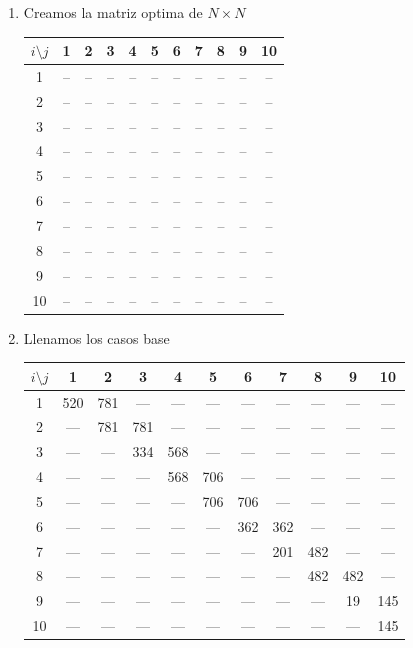 \begin{enumerate}
    \item Creamos la matriz optima de $N \times N$ 
    \begin{table}[h!]
    \centering
    \begin{tabular}{ccccccccccc}
    \toprule
    $i \setminus j$ & 1 & 2 & 3 & 4 & 5 & 6 & 7 & 8 & 9 & 10 \\
    \midrule
    1  & -- & -- & -- & -- & -- & -- & -- & -- & -- & -- \\
    2  & -- & -- & -- & -- & -- & -- & -- & -- & -- & -- \\
    3  & -- & -- & -- & -- & -- & -- & -- & -- & -- & -- \\
    4  & -- & -- & -- & -- & -- & -- & -- & -- & -- & -- \\
    5  & -- & -- & -- & -- & -- & -- & -- & -- & -- & -- \\
    6  & -- & -- & -- & -- & -- & -- & -- & -- & -- & -- \\
    7  & -- & -- & -- & -- & -- & -- & -- & -- & -- & -- \\
    8  & -- & -- & -- & -- & -- & -- & -- & -- & -- & -- \\
    9  & -- & -- & -- & -- & -- & -- & -- & -- & -- & -- \\
    10 & -- & -- & -- & -- & -- & -- & -- & -- & -- & -- \\
    \bottomrule
    \end{tabular}
    \end{table}

    \item Llenamos los casos base
    \begin{table}[h!]
    \centering
    \begin{tabular}{ccccccccccc}
    \toprule
    $i \setminus j$ & 1 & 2 & 3 & 4 & 5 & 6 & 7 & 8 & 9 & 10 \\
    \midrule
    1  & 520 & 781 & --- & --- & --- & --- & --- & --- & --- & --- \\
    2  & --- & 781 & 781 & --- & --- & --- & --- & --- & --- & --- \\
    3  & --- & --- & 334 & 568 & --- & --- & --- & --- & --- & --- \\
    4  & --- & --- & --- & 568 & 706 & --- & --- & --- & --- & --- \\
    5  & --- & --- & --- & --- & 706 & 706 & --- & --- & --- & --- \\
    6  & --- & --- & --- & --- & --- & 362 & 362 & --- & --- & --- \\
    7  & --- & --- & --- & --- & --- & --- & 201 & 482 & --- & --- \\
    8  & --- & --- & --- & --- & --- & --- & --- & 482 & 482 & --- \\
    9  & --- & --- & --- & --- & --- & --- & --- & --- &  19 & 145 \\
    10 & --- & --- & --- & --- & --- & --- & --- & --- & --- & 145 \\
    \bottomrule
    \end{tabular}
    \end{table}


\end{enumerate}
